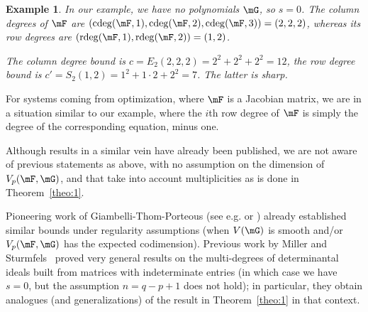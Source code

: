 \documentclass[12pt]{article}
\newtheorem{example}[definition]{Example}
\begin{document}

\begin{example}
  In our example, we have no polynomials $\mG$, so $s=0$. The column degrees of
  $\mF$ are $(\cdeg(\mF,1),\cdeg(\mF,2),\cdeg(\mF,3))=(2,2,2)$, whereas its
  row degrees are $(\rdeg(\mF,1),\rdeg(\mF,2))=(1,2)$. 

  The column degree bound is $c=E_2(2,2,2) = 2^2 + 2^2 +
  2^2 =12$, the row degree bound is $c'=S_2(1,2) = 1^2 + 1\cdot 2 +
  2^2 = 7$. The latter is sharp.
\end{example}
For systems coming from optimization, where $\mF$ is a Jacobian
matrix, we are in a situation similar to our example, where the $i$th
row degree of $\mF$ is simply the degree of the corresponding
equation, minus one.

Although results in a similar vein have already been published, we are
not aware of previous statements as above, with no assumption on the
dimension of $V_p(\mF,\mG)$, and that take into account multiplicities
as is done in Theorem~\ref{theo:1}.

Pioneering work of Giambelli-Thom-Porteous (see e.g. \cite{FP06} or
\cite{Fu92}) already established similar bounds under regularity
assumptions (when $V(\mG)$ is smooth and/or $V_p(\mF, \mG)$ has the
expected codimension). Previous work by Miller and
Sturmfels~\cite[Chapter~15]{MiSt04} proved very general results on the
multi-degrees of determinantal ideals built from matrices with
indeterminate entries (in which case we have $s=0$, but the assumption
$n=q-p+1$ does not hold); in particular, they obtain analogues (and
generalizations) of the result in Theorem~\ref{theo:1} in that
context.
\end{document}
